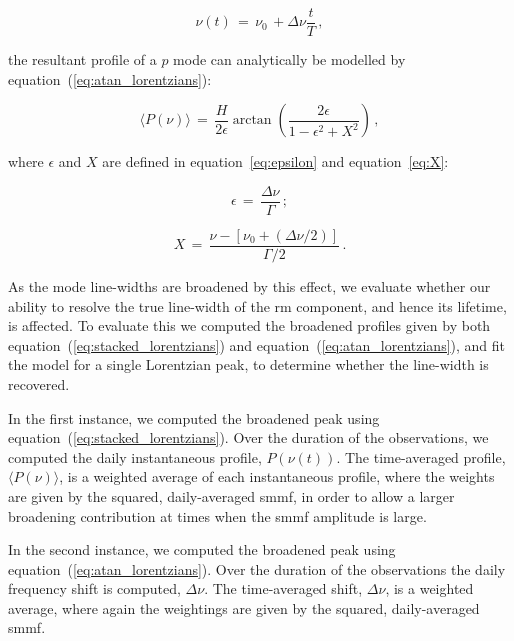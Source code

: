 \begin{equation}
\nu(t) \, = \, \nu_0 \, +  \Delta\nu \frac{t}{T} \, ,
\label{eq:linear_variation}
\end{equation}

the resultant profile of a $p$ mode can analytically be modelled by equation~(\ref{eq:atan_lorentzians}):

\begin{equation}
\langle P(\nu) \rangle \, = \, \frac{H}{2\epsilon} \arctan \left( \frac{2 \epsilon}{1 - \epsilon^2 + X^2 } \right) \, ,
\label{eq:atan_lorentzians}
\end{equation}

where $\epsilon$ and $X$ are defined in equation~\ref{eq:epsilon} and equation~\ref{eq:X}:

\begin{equation}
\epsilon \, = \, \frac{\Delta\nu}{\Gamma} \, ;
\label{eq:epsilon}
\end{equation}

\begin{equation}
X \, = \, \frac{\nu - [\nu_0 + (\Delta\nu/2)]}{\Gamma /2} \, .
\label{eq:X}
\end{equation}

As the mode line-widths are broadened by this effect, we evaluate whether our ability to resolve the true line-width of the \gls{rm} component, and hence its lifetime, is affected. To evaluate this we computed the broadened profiles given by both equation~(\ref{eq:stacked_lorentzians}) and equation~(\ref{eq:atan_lorentzians}), and fit the model for a single Lorentzian peak, to determine whether the line-width is recovered.

In the first instance, we computed the broadened peak using equation~(\ref{eq:stacked_lorentzians}). Over the duration of the observations, we computed the daily instantaneous profile, $P(\nu(t))$. The time-averaged profile, $ \langle P(\nu) \rangle$, is a weighted average of each instantaneous profile, where the weights are given by the squared, daily-averaged \gls{smmf}, in order to allow a larger broadening contribution at times when the \gls{smmf} amplitude is large.

In the second instance, we computed the broadened peak using equation~(\ref{eq:atan_lorentzians}). Over the duration of the observations the daily frequency shift is computed, $\Delta\nu$. The time-averaged shift, $\Delta\nu$, is a weighted average, where again the weightings are given by the squared, daily-averaged \gls{smmf}.

